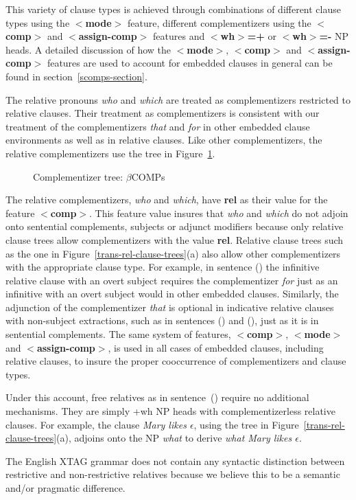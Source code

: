 
This variety of clause types is achieved through combinations of different
clause types using the {\bf $<$mode$>$} feature, different complementizers
using the {\bf $<$comp$>$} and {\bf $<$assign-comp$>$} features and {\bf
$<$wh$>$=+} or {\bf $<$wh$>$=-} NP heads. A detailed discussion of how the
{\bf $<$mode$>$}, {\bf $<$comp$>$} and {\bf $<$assign-comp$>$} features are
used to account for embedded clauses in general can be found in
section~\ref{scomps-section}.

The relative pronouns {\it who} and {\it which} are treated as complementizers
restricted to relative clauses.  Their treatment as complementizers is
consistent with our treatment of the complementizers {\it that} and {\it for}
in other embedded clause environments as well as in relative clauses. Like
other complementizers, the relative complementizers use the tree in
Figure~\ref{betaCOMPs}.


\begin{figure}[htb]
\centering
\mbox{}
\caption{Complementizer tree: $\beta$COMPs}
\label{betaCOMPs}
\end{figure}

The relative complementizers, {\it who} and {\it which}, have {\bf rel} as
their value for the feature {\bf $<$comp$>$}. This feature value insures that
{\it who} and {\it which} do not adjoin onto sentential complements, subjects
or adjunct modifiers because only relative clause trees allow complementizers
with the value {\bf rel}.  Relative clause trees such as the one in
Figure~\ref{trans-rel-clause-trees}(a) also allow other complementizers with
the appropriate clause type. For example, in sentence () the infinitive
relative clause with an overt subject requires the complementizer {\it for}
just as an infinitive with an overt subject would in other embedded
clauses. Similarly, the adjunction of the complementizer {\it that} is optional
in indicative relative clauses with non-subject extractions, such as in
sentences () and (), just as it is in sentential complements. The
same system of features, {\bf $<$comp$>$}, {\bf $<$mode$>$} and {\bf
$<$assign-comp$>$}, is used in all cases of embedded clauses, including
relative clauses, to insure the proper cooccurrence of complementizers and
clause types.

Under this account, free relatives as in sentence~() require no
additional mechanisms. They are simply +wh NP heads with complementizerless
relative clauses. For example, the clause {\it Mary likes $\epsilon$}, using
the tree in Figure~\ref{trans-rel-clause-trees}(a), adjoins onto the NP {\it
what} to derive {\it what Mary likes $\epsilon$}.

The English XTAG grammar does not contain any  syntactic distinction between
restrictive and non-restrictive relatives because we believe this to
be a semantic and/or pragmatic difference.
